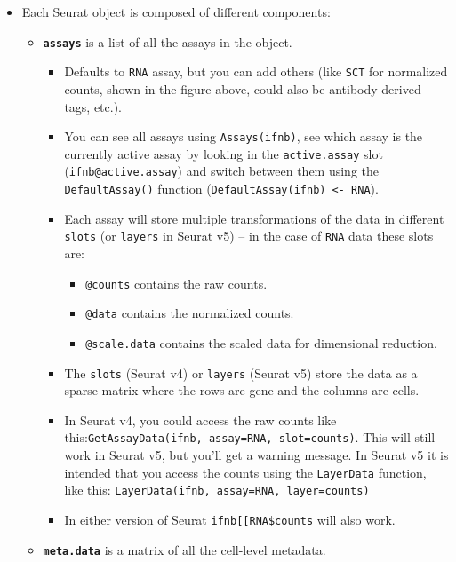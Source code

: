 \documentclass[
  letterpaper,
  DIV=11,
  numbers=noendperiod]{scrreprt}
\providecommand{\tightlist}{%
  \setlength{\itemsep}{0pt}\setlength{\parskip}{0pt}}
\begin{document}
\begin{itemize}
\tightlist
\item
  Each Seurat object is composed of different components:

  \begin{itemize}
  \tightlist
  \item
    \textbf{\texttt{assays}} is a list of all the assays in the object.

    \begin{itemize}
    \item
      Defaults to \texttt{RNA} assay, but you can add others (like
      \texttt{SCT} for normalized counts, shown in the figure above,
      could also be antibody-derived tags, etc.).
    \item
      You can see all assays using \texttt{Assays(ifnb)}, see which
      assay is the currently active assay by looking in the
      \texttt{active.assay} slot (\texttt{ifnb@active.assay}) and switch
      between them using the \texttt{DefaultAssay()} function
      (\texttt{DefaultAssay(ifnb)\ \textless{}-\ \textquotesingle{}RNA\textquotesingle{}}).
    \item
      Each assay will store multiple transformations of the data in
      different \texttt{slots} (or \texttt{layers} in Seurat v5) -- in
      the case of \texttt{RNA} data these slots are:

      \begin{itemize}
      \tightlist
      \item
        \texttt{@counts} contains the raw counts.
      \item
        \texttt{@data} contains the normalized counts.
      \item
        \texttt{@scale.data} contains the scaled data for dimensional
        reduction.
      \end{itemize}
    \item
      The \texttt{slots} (Seurat v4) or \texttt{layers} (Seurat v5)
      store the data as a sparse matrix where the rows are gene and the
      columns are cells.
    \item
      In Seurat v4, you could access the raw counts like
      this:\texttt{GetAssayData(ifnb,\ assay=\textquotesingle{}RNA\textquotesingle{},\ slot=\textquotesingle{}counts\textquotesingle{})}.
      This will still work in Seurat v5, but you'll get a warning
      message. In Seurat v5 it is intended that you access the counts
      using the \texttt{LayerData} function, like this:
      \texttt{LayerData(ifnb,\ assay=\textquotesingle{}RNA\textquotesingle{},\ layer=\textquotesingle{}counts\textquotesingle{})}
    \item
      In either version of Seurat
      \texttt{ifnb{[}{[}\textquotesingle{}RNA\textquotesingle{}{]}{]}\$counts}
      will also work.
    \end{itemize}
  \item
    \textbf{\texttt{meta.data}} is a matrix of all the cell-level
    metadata.


\end{itemize}
\end{itemize}
\end{document}
